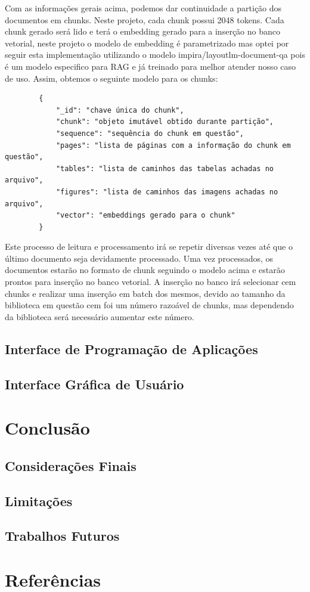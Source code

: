 \documentclass[a4paper, 12pt]{article}
\begin{document}
    Com as informações gerais acima, podemos dar continuidade a partição dos documentos em chunks. Neste projeto, cada chunk possui 2048 tokens. Cada chunk gerado será lido e terá o embedding gerado para a inserção no banco vetorial, neste projeto o modelo de embedding é parametrizado mas optei por seguir esta implementação utilizando o modelo impira/layoutlm-document-qa pois é um modelo especifico para RAG e já treinado para melhor atender nosso caso de uso. Assim, obtemos o seguinte modelo para os chunks:

    \begin{lstlisting}
        {
            "_id": "chave única do chunk",
            "chunk": "objeto imutável obtido durante partição",
            "sequence": "sequência do chunk em questão",
            "pages": "lista de páginas com a informação do chunk em questão",
            "tables": "lista de caminhos das tabelas achadas no arquivo",
            "figures": "lista de caminhos das imagens achadas no arquivo",
            "vector": "embeddings gerado para o chunk"
        }
    \end{lstlisting}

    Este processo de leitura e processamento irá se repetir diversas vezes até que o último documento seja devidamente processado. Uma vez processados, os documentos estarão no formato de chunk seguindo o modelo acima e estarão prontos para inserção no banco vetorial. A inserção no banco irá selecionar cem chunks e realizar uma inserção em batch dos mesmos, devido ao tamanho da biblioteca em questão cem foi um número razoável de chunks, mas dependendo da biblioteca será necessário aumentar este número.

    \subsection{Interface de Programação de Aplicações}
    \lipsum[3-4]

    \subsection{Interface Gráfica de Usuário}
    \lipsum[5-6]

    \clearpage

    \section{Conclusão}
    \subsection{Considerações Finais}
    \lipsum[1-2]
    \subsection{Limitações}
    \lipsum[3-4]
    \subsection{Trabalhos Futuros}
    \lipsum[5-6]

    \clearpage

    \section*{Referências}

    \nocite{*}

    \sectionfont{\raggedright}
    \printbibliography
    
\end{document}
